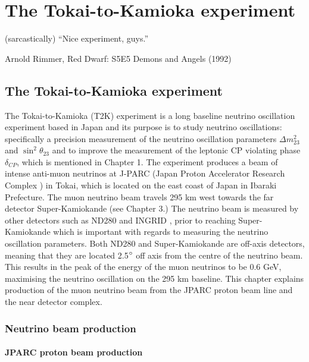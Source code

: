\chapter{The Tokai-to-Kamioka experiment}
\epigraph{(sarcastically) ``Nice experiment, guys.''}{Arnold Rimmer, Red Dwarf: S5E5 Demons and Angels (1992) }
\label{chp:t2kdetector}

\section{The Tokai-to-Kamioka experiment}
The Tokai-to-Kamioka (T2K) experiment \cite{KANEYUKI2005178} is a long baseline neutrino oscillation experiment based in Japan and its purpose is to study neutrino oscillations: specifically a precision measurement of the neutrino oscillation parameters $\Delta m_{23}^{2}$ and $\sin ^{2} \theta_{23}$ and to improve the measurement of the leptonic CP violating phase $\delta_{CP}$, which is mentioned in Chapter 1. The experiment produces a beam of intense anti-muon neutrinos at J-PARC (Japan Proton Accelerator Research Complex \cite{nagamiya2012introduction}) in Tokai, which is located on the east coast of Japan in Ibaraki Prefecture. The muon neutrino beam travels 295 km west towards the far detector Super-Kamiokande (see Chapter 3.)  The neutrino beam is measured by other detectors such as ND280 \cite{kudenko2009near} and INGRID \cite{abe2012measurements}, prior to reaching Super-Kamiokande which is important with regards to measuring the neutrino oscillation parameters. Both ND280 and Super-Kamiokande are off-axis detectors, meaning that they are located 2.5$\degree$ off axis from the centre of the neutrino beam. This results in the peak of the energy of the muon neutrinos to be 0.6 GeV, maximising the neutrino oscillation on the 295 km baseline. This chapter explains production of the muon neutrino beam from the JPARC proton beam line and the near detector complex.


\subsection{Neutrino beam production}

\subsubsection{JPARC proton beam production}


